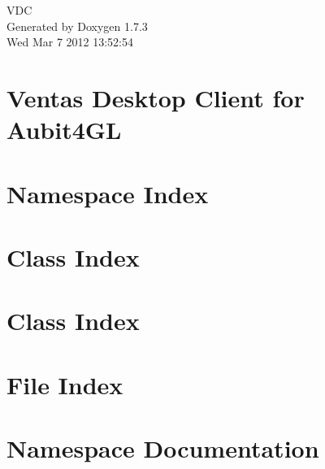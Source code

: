 \documentclass[a4paper]{book}
\begin{document}
\hypersetup{pageanchor=false}
\begin{titlepage}
\vspace*{7cm}
\begin{center}
{\Large VDC }\\
\vspace*{1cm}
{\large Generated by Doxygen 1.7.3}\\
\vspace*{0.5cm}
{\small Wed Mar 7 2012 13:52:54}\\
\end{center}
\end{titlepage}
\clearemptydoublepage
{}
\tableofcontents
\clearemptydoublepage
{}
\hypersetup{pageanchor=true}
\chapter{Ventas Desktop Client for Aubit4GL}
\label{index}\hypertarget{index}{}
\chapter{Namespace Index}

\chapter{Class Index}

\chapter{Class Index}

\chapter{File Index}

\chapter{Namespace Documentation}





\end{document}

